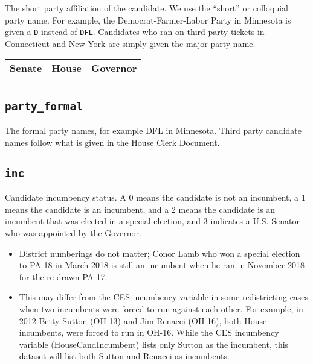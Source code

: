 \documentclass[12pt]{article}
\begin{document}
The short party affiliation of the candidate. We use the ``short'' or colloquial party name. For example, the Democrat-Farmer-Labor Party in Minnesota is given a \texttt{D} instead of \texttt{DFL}. Candidates who ran on third party tickets in Connecticut and New York are simply given the major party name.   
\begin{table}[!h]
\begin{adjustwidth}{-4em}{-4em}
\centering
\begin{tabularx}{\linewidth}{CCC}
\textbf{Senate} & \textbf{House} & \textbf{Governor}\\
   &  &
\end{tabularx}
\end{adjustwidth}
\end{table}


\FloatBarrier 

\subsection*{\texttt{party\_formal}}
The formal party names, for example DFL in Minnesota. Third party candidate names follow what is given in the House Clerk Document. 

\twocolumn
\begin{adjustwidth}{-5em}{-5em}
\centering
{\scriptsize

}
\end{adjustwidth}

\onecolumn



\subsection*{\texttt{inc}}

Candidate incumbency status. A 0 means the candidate is not an incumbent, a 1 means the candidate is an incumbent, and a 2 means the candidate is an incumbent that was elected in a special election, and 3 indicates a U.S. Senator who was appointed by the Governor.
\begin{itemize}
\item District numberings do not matter; Conor Lamb who won a special election to PA-18 in March 2018 is still an incumbent when he ran in November 2018 for the re-drawn PA-17.
\item This may differ from the CES incumbency variable in some redistricting cases when two incumbents were forced to run against each other. For example, in 2012 Betty Sutton (OH-13) and Jim Renacci (OH-16), both House incumbents, were forced to run in OH-16. While the CES incumbency variable (HouseCandIncumbent) lists only Sutton as the incumbent, this dataset will list both Sutton and Renacci as incumbents. 

\end{itemize}
\end{document}
